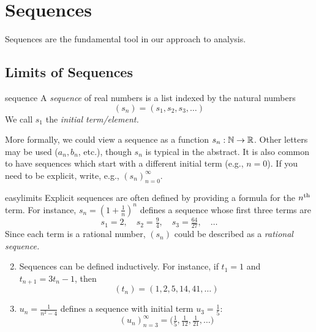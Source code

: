 \graphicspath{{2limits/asy/}}

\section{Sequences}
\setcounter{subsection}{6}

Sequences are the fundamental tool in our approach to analysis.

\subsection{Limits of Sequences}

\begin{defn}{}{sequence}
	A \emph{sequence} of real numbers is a list indexed by the natural numbers
	\[
		(s_n)=(s_1,s_2,s_3,\ldots)
	\]
	We call $s_1$ the \emph{initial term/element.}
\end{defn}

More formally, we could view a sequence as a function $s_n:\mathbb{N}\to\mathbb{R}$. Other letters may be used ($a_n,b_n$, etc.), though $s_n$ is typical in the abstract. It is also common to have sequences which start with a different initial term (e.g., $n=0$). If you need to be explicit, write, e.g., $(s_n)_{n=0}^\infty$.


\begin{examples}{}{easylimits}
	\exstart Explicit sequences are often defined by providing a formula for the $n\textsuperscript{th}$ term. For instance, $s_n=\left(1+\frac 1n\right)^n$ defines a sequence whose first three terms are
	\[
		s_1=2,\quad s_2=\tfrac 94,\quad s_3=\tfrac{64}{27},\quad\ldots
	\]
	Since each term is a rational number, $(s_n)$ could be described as a \emph{rational sequence.}
	\begin{enumerate}\setcounter{enumi}{1}
	  \item\label{ex:easylimits2} Sequences can be defined inductively. For instance, if $t_1=1$ and $t_{n+1}=3t_n-1$, then
	  \[
	  	(t_n)=(1,2,5,14,41,\ldots)
	  \]
	  \item $u_n=\frac 1{n^2-4}$ defines a sequence with initial term $u_3=\frac 15$:
	  \[
	  	(u_n)_{n=3}^\infty =\bigl(\tfrac 15,\tfrac 1{12},\tfrac 1{21},\ldots\bigr)
	  \]
	\end{enumerate}
\end{examples}



